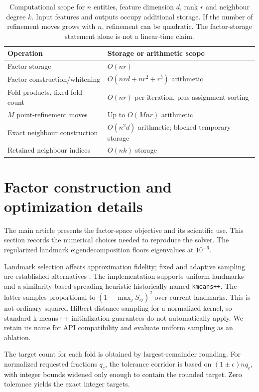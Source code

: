 \begin{table}[htbp]\centering
\begin{tabular}{ll}
\toprule
Operation & Storage or arithmetic scope\\
\midrule
Factor storage & $O(nr)$\\
Factor construction/whitening & $O(nrd+nr^2+r^3)$ arithmetic\\
Fold products, fixed fold count & $O(nr)$ per iteration, plus assignment sorting\\
$M$ point-refinement moves & Up to $O(Mnr)$ arithmetic\\
Exact neighbour construction & $O(n^2d)$ arithmetic; blocked temporary storage\\
Retained neighbour indices & $O(nk)$ storage\\
\bottomrule
\end{tabular}
\caption{Computational scope for $n$ entities, feature dimension $d$, rank $r$
and neighbour degree $k$. Input features and outputs occupy additional storage.
If the number of refinement moves grows with $n$, refinement can be quadratic.
The factor-storage statement alone is not a linear-time claim.}
\end{table}

\section{Factor construction and optimization details}

The main article presents the factor-space objective and its scientific use.
This section records the numerical choices needed to reproduce the solver.
The regularized landmark eigendecomposition floors eigenvalues at $10^{-6}$.

Landmark selection affects approximation fidelity; fixed and adaptive sampling
are established alternatives \citep{kumar2012,musco2017}. The implementation
supports uniform landmarks and a similarity-based spreading
heuristic historically named \texttt{kmeans++}. The latter samples proportional
to $(1-\max_j S_{ij})^2$ over current landmarks. This is not ordinary squared
Hilbert-distance sampling for a normalized kernel, so standard k-means++
initialization guarantees do not automatically apply. We retain its name for API
compatibility and evaluate uniform sampling as an ablation.


The target count for each fold is obtained by largest-remainder rounding.
For normalized requested fractions $q_c$, the tolerance corridor is based on
$(1\pm\epsilon)nq_c$, with integer bounds widened only enough to contain the
rounded target. Zero tolerance yields the exact integer targets.

